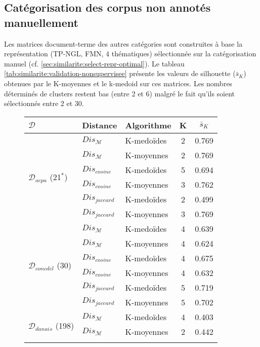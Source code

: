 \subsection{Catégorisation des corpus non annotés manuellement}
Les matrices document-terme des autres catégories sont construites à base la  représentation (TP-NGL, FMN,  4 thématiques) sélectionnée sur la catégorisation manuel (cf. \ref{sec:similarite:select-repr-optimal}). Le tableau \ref{tab:similarite:validation-nonsupervisee} présente les valeurs de silhouette ($\bar{s}_K$) obtenues par le K-moyennes et le k-medoid sur ces matrices. Les nombres déterminés de clusters restent bas (entre 2 et 6) malgré le fait qu'ils soient sélectionnés entre 2 et 30. 
\newlength{\mrcell}
\setlength{\mrcell}{0.8cm}
\begin{table}[!htb]
	\scriptsize
	\begin{subfigure}[ht]{0.49\textwidth}
	\begin{tabular}[pos]{|l|l|l|c|c|}
		\hline
		$\mathcal{D}$& \textbf{Distance} & \textbf{Algorithme}& \textbf{K}  & $\bar{s}_K$  \\ \hline
	\multirow{6}{\mrcell}{$\mathcal{D}_{acpa}$ (21$^*$)} & $Dis_\mathcal{M}$ & K-medoïdes & 2 & 0.769  \\ \cline{2-5}
	& $Dis_\mathcal{M}$ & K-moyennes & 2 & 0.769 \\ \cline{2-5}
	& $Dis_{cosine}$ & K-medoïdes & 5 & 0.694 \\ \cline{2-5}
	& $Dis_{cosine}$ & K-moyennes & 3 & 0.762  \\ \cline{2-5}
	& $Dis_{jaccard}$ & K-medoïdes & 2 & 0.499  \\ \cline{2-5}
	& $Dis_{jaccard}$ & K-moyennes & 3 & 0.769 \\ \hline
	\multirow{6}{\mrcell}{$\mathcal{D}_{concdel}$ (30)}  & $Dis_\mathcal{M}$ & K-medoïdes & 4 & 0.639  \\ \cline{2-5}
	& $Dis_\mathcal{M}$ & K-moyennes & 4 & 0.624  \\ \cline{2-5}
	& $Dis_{cosine}$ & K-medoïdes & 4 & 0.675  \\ \cline{2-5}
	& $Dis_{cosine}$ & K-moyennes & 4 & 0.632  \\ \cline{2-5}
	& $Dis_{jaccard}$ & K-medoïdes & 5 & 0.719  \\ \cline{2-5}
	& $Dis_{jaccard}$ & K-moyennes & 5 & 0.702\\ \hline
	\multirow{6}{\mrcell}{$\mathcal{D}_{danais}$ (198)} 
	& $Dis_\mathcal{M}$ & K-medoïdes & 4 & 0.403  \\ \cline{2-5}
	& $Dis_\mathcal{M}$ & K-moyennes & 2 & 0.442  \\ \cline{2-5}

\end{tabular}
\end{subfigure}
\end{table}
